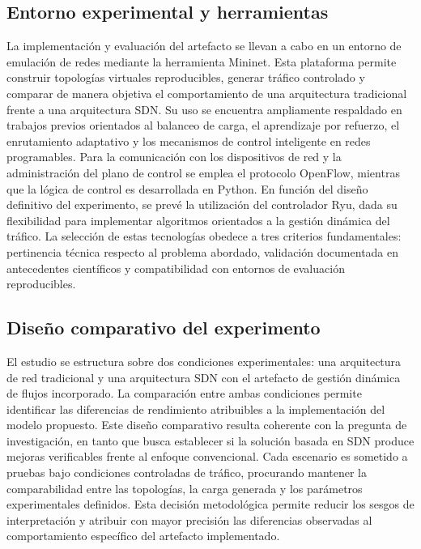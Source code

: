 \documentclass[12pt,a4paper]{article}
\begin{document}
\subsection{Entorno experimental y herramientas}
La implementación y evaluación del artefacto se llevan a cabo en un entorno de emulación de redes mediante la herramienta Mininet. Esta plataforma permite construir topologías virtuales reproducibles, generar tráfico controlado y comparar de manera objetiva el comportamiento de una arquitectura tradicional frente a una arquitectura SDN. Su uso se encuentra ampliamente respaldado en trabajos previos orientados al balanceo de carga, el aprendizaje por refuerzo, el enrutamiento adaptativo y los mecanismos de control inteligente en redes programables\parencite{ddqn_sdn, dynamic_lb_sdn, cognitive_routing_sdn, qos_lb_sdn}.
Para la comunicación con los dispositivos de red y la administración del plano de control se emplea el protocolo OpenFlow, mientras que la lógica de control es desarrollada en Python. En función del diseño definitivo del experimento, se prevé la utilización del controlador Ryu, dada su flexibilidad para implementar algoritmos orientados a la gestión dinámica del tráfico. La selección de estas tecnologías obedece a tres criterios fundamentales: pertinencia técnica respecto al problema abordado, validación documentada en antecedentes científicos y compatibilidad con entornos de evaluación reproducibles.

\subsection{Diseño comparativo del experimento}
El estudio se estructura sobre dos condiciones experimentales: una arquitectura de red tradicional y una arquitectura SDN con el artefacto de gestión dinámica de flujos incorporado. La comparación entre ambas condiciones permite identificar las diferencias de rendimiento atribuibles a la implementación del modelo propuesto. Este diseño comparativo resulta coherente con la pregunta de investigación, en tanto que busca establecer si la solución basada en SDN produce mejoras verificables frente al enfoque convencional.
Cada escenario es sometido a pruebas bajo condiciones controladas de tráfico, procurando mantener la comparabilidad entre las topologías, la carga generada y los parámetros experimentales definidos. Esta decisión metodológica permite reducir los sesgos de interpretación y atribuir con mayor precisión las diferencias observadas al comportamiento específico del artefacto implementado.
\end{document}
